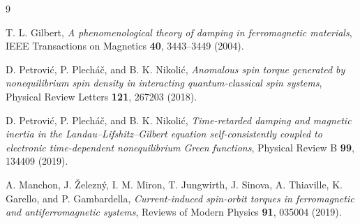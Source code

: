 \documentclass[11pt]{article}
\begin{document}
\begin{thebibliography}{9}

T. L. Gilbert,
\textit{A phenomenological theory of damping in ferromagnetic materials},
IEEE Transactions on Magnetics \textbf{40}, 3443--3449 (2004).

D. Petrovi\'c, P. Plech\'a\v{c}, and B. K. Nikoli\'c,
\textit{Anomalous spin torque generated by nonequilibrium spin density in interacting quantum-classical spin systems},
Physical Review Letters \textbf{121}, 267203 (2018).

D. Petrovi\'c, P. Plech\'a\v{c}, and B. K. Nikoli\'c,
\textit{Time-retarded damping and magnetic inertia in the Landau--Lifshitz--Gilbert equation self-consistently coupled to electronic time-dependent nonequilibrium Green functions},
Physical Review B \textbf{99}, 134409 (2019).

A. Manchon, J. \v{Z}elezn\'y, I. M. Miron, T. Jungwirth, J. Sinova, A. Thiaville, K. Garello, and P. Gambardella,
\textit{Current-induced spin-orbit torques in ferromagnetic and antiferromagnetic systems},
Reviews of Modern Physics \textbf{91}, 035004 (2019).

\end{thebibliography}
\end{document}

